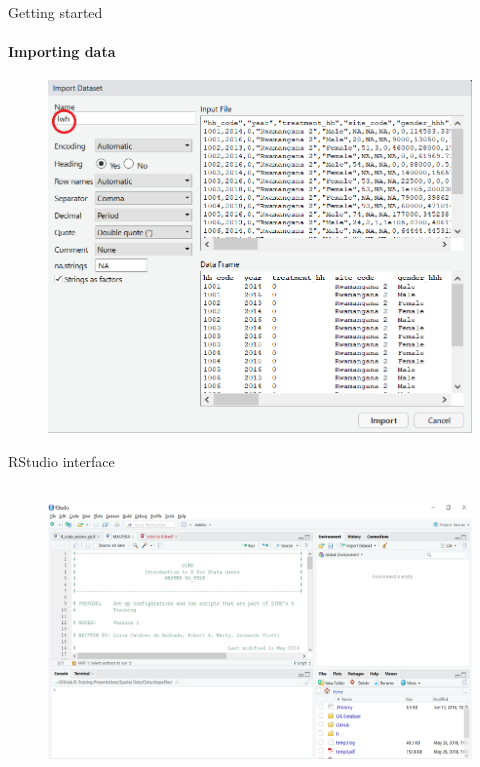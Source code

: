 \documentclass[ignorenonframetext,]{beamer}
\begin{document}
\begin{frame}{Getting started}

\framesubtitle{Importing data}

\begin{figure}
\centering
  \includegraphics[scale=0.5]{img/import_data2.png}
\end{figure}

\end{frame}

\begin{frame}{RStudio interface}

\begin{figure}
\centering
  \includegraphics[width=12cm,height=7.7cm]{img/enviroment.png}
\end{figure}

\end{frame}
\end{document}
